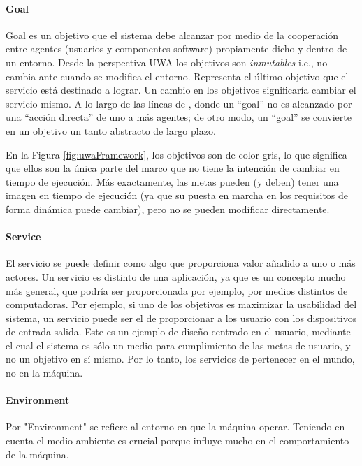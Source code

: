 \paragraph{Goal}

Goal es un objetivo que el sistema debe alcanzar por medio de la cooperación entre agentes (usuarios y componentes  software) propiamente dicho y dentro
de un entorno. Desde la perspectiva UWA los objetivos son
\textit{inmutables} i.e., no cambia ante cuando se modifica el entorno.
Representa el último objetivo que el servicio está destinado a lograr. Un
cambio en los objetivos significaría cambiar el servicio mismo. A lo largo de
las líneas de \cite{uwa5}, donde un “goal” no es alcanzado por una “acción directa” de uno a más agentes; de otro modo, un “goal” se convierte en un objetivo un tanto
abstracto de largo plazo.

En la Figura \ref{fig:uwaFramework}, los objetivos son de color gris, lo que
significa que ellos son la única parte del marco que no tiene la intención de
cambiar en tiempo de ejecución. Más exactamente, las metas pueden (y deben)
tener una imagen en tiempo de ejecución (ya que su puesta en marcha
en los requisitos de forma dinámica puede cambiar), pero no se pueden modificar
directamente.

\paragraph{Service}

El servicio se puede definir como algo que proporciona valor añadido a uno o más
actores. Un servicio es distinto de
una aplicación, ya que es un concepto mucho más general, que podría ser
proporcionada por ejemplo, por medios distintos de
computadoras. Por ejemplo, si uno de los objetivos es maximizar la usabilidad
del sistema, un servicio puede ser el de proporcionar a los usuario con los
dispositivos de entrada-salida. Este es un ejemplo de diseño centrado en el
usuario, mediante el cual el sistema es sólo un medio para
cumplimiento de las metas de usuario, y no un objetivo en sí mismo. Por lo
tanto, los servicios de pertenecer en el mundo, no en la máquina.


\paragraph{Environment}

Por "Environment" se refiere al entorno en que la máquina
operar. Teniendo en cuenta el medio ambiente es crucial porque influye mucho en
el comportamiento de la máquina.


